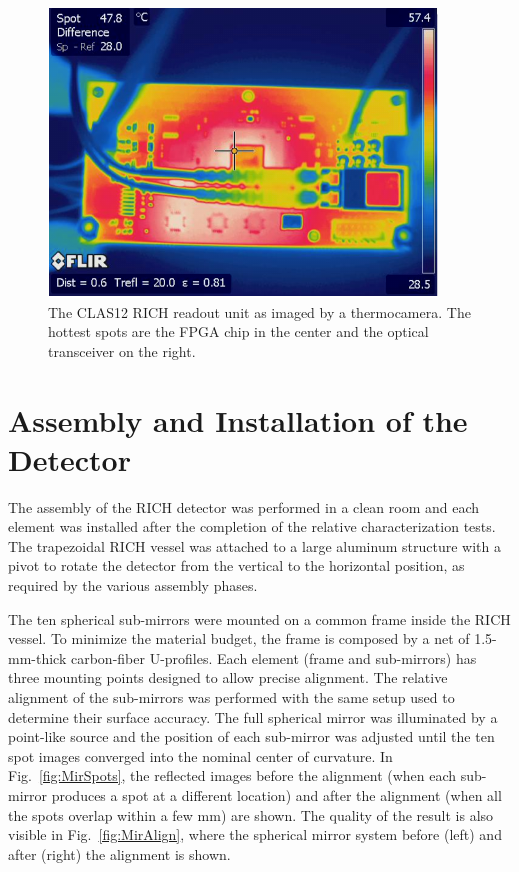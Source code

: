 \documentclass[5p,times,twocolumn]{elsarticle}
\begin{document}
\begin{figure}[t]
\begin{center}
\includegraphics[width=0.90\columnwidth]{FPGA_heat.pdf}
\end{center}
\caption{The CLAS12 RICH readout unit as imaged by a thermocamera. The hottest spots are the FPGA chip in the
  center and the optical transceiver on the right.}
\label{Fig:EleTile}
\end{figure}

\section{Assembly and Installation of the Detector}

The assembly of the RICH detector was performed in a clean room and each element was installed after the completion
of the relative characterization tests. The trapezoidal RICH vessel was attached to a large aluminum structure with a
pivot to rotate the detector from the vertical to the horizontal position, as required by the various assembly phases.

The ten spherical sub-mirrors were mounted on a common frame inside the RICH vessel. To
minimize the material budget, the frame is composed by a net of 1.5-mm-thick carbon-fiber U-profiles. Each element
(frame and sub-mirrors) has three mounting points designed to allow precise alignment. The relative alignment of
the sub-mirrors was performed with the same setup used to determine their surface accuracy. The full spherical
mirror was illuminated by a point-like source and the position of each sub-mirror was adjusted until the ten spot images
converged into the nominal center of curvature. In Fig.~\ref{fig:MirSpots}, the reflected images before the alignment
(when each sub-mirror produces a spot at a different location) and after the alignment (when all the spots overlap
within a few mm) are shown. The quality of the result is also visible in Fig.~\ref{fig:MirAlign}, where the spherical
mirror system before (left) and after (right) the alignment is shown.
\end{document}
